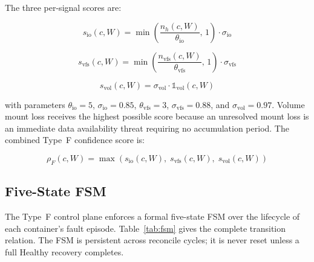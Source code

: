 \documentclass[runningheads]{llncs}
\begin{document}
The three per-signal scores are:

\begin{equation}
s_{\mathrm{io}}(c,W) = \min\!\left(\frac{n_h(c,W)}{\theta_{\mathrm{io}}},\,1\right) \cdot \sigma_{\mathrm{io}}
\label{eq:sio}
\end{equation}

\begin{equation}
s_{\mathrm{vfs}}(c,W) = \min\!\left(\frac{n_{\mathrm{vfs}}(c,W)}{\theta_{\mathrm{vfs}}},\,1\right) \cdot \sigma_{\mathrm{vfs}}
\label{eq:svfs}
\end{equation}

\begin{equation}
s_{\mathrm{vol}}(c,W) = \sigma_{\mathrm{vol}} \cdot \mathbb{1}_{\mathrm{vol}}(c,W)
\label{eq:svol}
\end{equation}

with parameters $\theta_{\mathrm{io}} = 5$, $\sigma_{\mathrm{io}} = 0.85$,
$\theta_{\mathrm{vfs}} = 3$, $\sigma_{\mathrm{vfs}} = 0.88$, and
$\sigma_{\mathrm{vol}} = 0.97$. Volume mount loss receives the highest
possible score because an unresolved mount loss is an immediate data
availability threat requiring no accumulation period. The combined
Type~F confidence score is:

\begin{equation}
\rho_F(c,W) = \max\!\left(s_{\mathrm{io}}(c,W),\; s_{\mathrm{vfs}}(c,W),\; s_{\mathrm{vol}}(c,W)\right)
\label{eq:rhof}
\end{equation}

\subsection{Five-State FSM}

The Type~F control plane enforces a formal five-state FSM over the
lifecycle of each container's fault episode. Table~\ref{tab:fsm} gives
the complete transition relation. The FSM is persistent across reconcile
cycles; it is never reset unless a full Healthy recovery completes.
\end{document}
